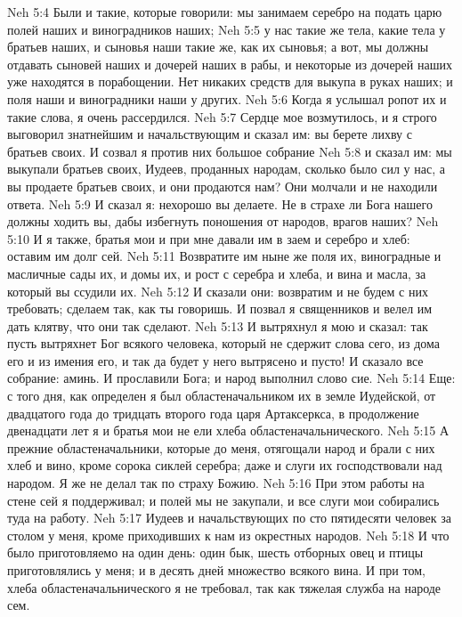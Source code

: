 \vs Neh 5:4 Были и такие, которые говорили: мы занимаем серебро на подать царю  полей наших и виноградников наших;
\vs Neh 5:5 у нас такие же тела, какие тела у братьев наших, и сыновья наши такие же, как их сыновья; а вот, мы должны отдавать сыновей наших и дочерей наших в рабы, и некоторые из дочерей наших уже находятся в порабощении. Нет никаких средств для выкупа в руках наших; и поля наши и виноградники наши у других.
\rsbpar\vs Neh 5:6 Когда я услышал ропот их и такие слова, я очень рассердился.
\vs Neh 5:7 Сердце мое возмутилось, и я строго выговорил знатнейшим и начальствующим и сказал им: вы берете лихву с братьев своих. И созвал я против них большое собрание
\vs Neh 5:8 и сказал им: мы выкупали братьев своих, Иудеев, проданных народам, сколько было сил у нас, а вы продаете братьев своих, и они продаются нам? Они молчали и не находили ответа.
\vs Neh 5:9 И сказал я: нехорошо вы делаете. Не в страхе ли Бога нашего должны ходить вы, дабы избегнуть поношения от народов, врагов наших?
\vs Neh 5:10 И я также, братья мои и  при мне давали им в заем и серебро и хлеб: оставим им долг сей.
\vs Neh 5:11 Возвратите им ныне же поля их, виноградные и масличные сады их, и домы их, и рост с серебра и хлеба, и вина и масла, за который вы ссудили их.
\vs Neh 5:12 И сказали они: возвратим и не будем с них требовать; сделаем так, как ты говоришь. И позвал я священников и велел им дать клятву, что они так сделают.
\vs Neh 5:13 И вытряхнул я  мою и сказал: так пусть вытряхнет Бог всякого человека, который не сдержит слова сего, из дома его и из имения его, и так да будет у него вытрясено и пусто! И сказало все собрание: аминь. И прославили Бога; и народ выполнил слово сие.
\rsbpar\vs Neh 5:14 Еще: с того дня, как определен я был областеначальником их в земле Иудейской, от двадцатого года до тридцать второго года царя Артаксеркса, в продолжение двенадцати лет я и братья мои не ели хлеба областеначальнического.
\vs Neh 5:15 А прежние областеначальники, которые  до меня, отягощали народ и брали с них хлеб и вино, кроме сорока сиклей серебра; даже и слуги их господствовали над народом. Я же не делал так по страху Божию.
\vs Neh 5:16 При этом работы на стене сей я поддерживал; и полей мы не закупали, и все слуги мои собирались туда на работу.
\vs Neh 5:17 Иудеев и начальствующих по сто пятидесяти человек  за столом у меня, кроме приходивших к нам из окрестных народов.
\vs Neh 5:18 И  что было приготовляемо на один день: один бык, шесть отборных овец и птицы приготовлялись у меня; и в десять дней  множество всякого вина. И при  том, хлеба областеначальнического я не требовал, так как тяжелая служба  на народе сем.
